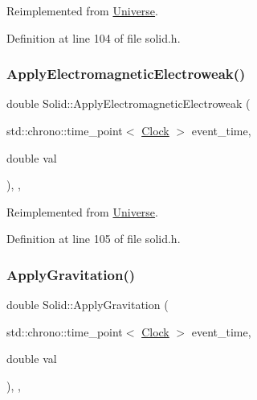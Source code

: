 Reimplemented from \hyperlink{class_universe_a1f787da78fa196ba635db21a9e91dabb}{Universe}.



Definition at line 104 of file solid.\+h.

\mbox{\label{class_solid_a46702e3109994b310eb4f1fba5610e0b}} 
\subsubsection{\texorpdfstring{Apply\+Electromagnetic\+Electroweak()}{ApplyElectromagneticElectroweak()}}
{\footnotesize\ttfamily double Solid\+::\+Apply\+Electromagnetic\+Electroweak (\begin{DoxyParamCaption}\item[{std\+::chrono\+::time\+\_\+point$<$ \hyperlink{universe_8h_a0ef8d951d1ca5ab3cfaf7ab4c7a6fd80}{Clock} $>$}]{event\+\_\+time,  }\item[{double}]{val }\end{DoxyParamCaption})\hspace{0.3cm}{\ttfamily [inline]}, {\ttfamily [final]}, {\ttfamily [virtual]}}



Reimplemented from \hyperlink{class_universe_a4c36c1ab30db993307f88363dde5e8c5}{Universe}.



Definition at line 105 of file solid.\+h.

\mbox{\label{class_solid_af2b3133138ce2482faa462d07aa23042}} 
\subsubsection{\texorpdfstring{Apply\+Gravitation()}{ApplyGravitation()}}
{\footnotesize\ttfamily double Solid\+::\+Apply\+Gravitation (\begin{DoxyParamCaption}\item[{std\+::chrono\+::time\+\_\+point$<$ \hyperlink{universe_8h_a0ef8d951d1ca5ab3cfaf7ab4c7a6fd80}{Clock} $>$}]{event\+\_\+time,  }\item[{double}]{val }\end{DoxyParamCaption})\hspace{0.3cm}{\ttfamily [inline]}, {\ttfamily [final]}, {\ttfamily [virtual]}}



